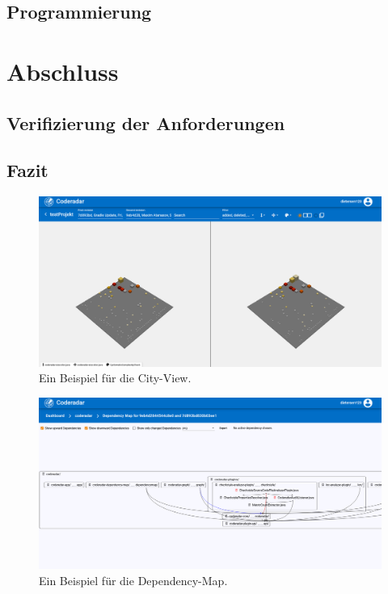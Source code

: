 \documentclass[
	oneside,  %
	ngerman, 
	final, 
	11pt, 
	a4paper, 
	1.1headlines, 
	headinclude=false, 
	footinclude=false, 
	mpinclude=false, 
	pagesize, 
	onecolumn, 
	titlepage, 
	parskip=half, 
	headsepline, 
	chapterprefix=false, 
	version=first, 
	listof=totoc, 
	bibliography=totoc, 
	toc=graduated, 
	fleqn
]{scrbook}
\begin{document}
\section{Programmierung}
\label{Programmierung}


\chapter{Abschluss}
\label{Abschluss}


\section{Verifizierung der Anforderungen}
\label{Verifizierung_Anforderungen}


\section{Fazit}
\label{Fazit}


\begin{figure}[htb]
	\begin{center}
		\includegraphics[width=\linewidth]{images/city_view}
		\caption{Ein Beispiel für die City-View.}
		\label{city_view}
	\end{center}
\end{figure}

\begin{figure}[htb]
	\begin{center}
		\includegraphics[width=\linewidth]{images/dependency_map}
		\caption{Ein Beispiel für die Dependency-Map.}
		\label{dependency_map}
	\end{center}
\end{figure}
\end{document}
